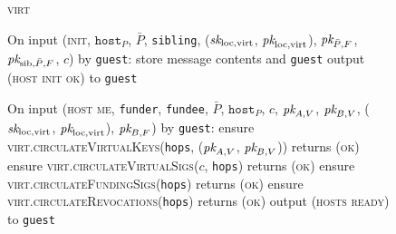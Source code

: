 \begin{figure}[H]
  \begin{processbox}{\textsc{virt}}
    \begin{algorithmic}[1]
      \State On input (\textsc{init}, $\texttt{host}_P$, $\bar{P}$,
      \texttt{sibling}, ($\textit{sk}_{\mathrm{loc}, \mathrm{virt}}$, $\textit{pk}_{\mathrm{loc},
      \mathrm{virt}}$), $\textit{pk}_{\bar{P}, F}$, $\textit{pk}_{\mathrm{sib}, \bar{P}, F}$, $c$)
      by \texttt{guest}:
      \Indent
        \State store message contents and \texttt{guest}
        \State output (\textsc{host init ok}) to \texttt{guest}
      \EndIndent
      \Statex

      \State On input (\textsc{host me}, \texttt{funder}, \texttt{fundee},
      $\bar{P}$, $\texttt{host}_P$, $c$, $\textit{pk}_{A, V}$, $\textit{pk}_{B, V}$,
      ($\textit{sk}_{\mathrm{loc}, \mathrm{virt}}$, $\textit{pk}_{\mathrm{loc}, \mathrm{virt}}$),
      $\textit{pk}_{B, F}$) by \texttt{guest}:
      \State {}
      \Indent
        \State ensure \textsc{virt.circulateVirtualKeys}(\texttt{hops}, ($\textit{pk}_{A,
        V}$, $\textit{pk}_{B, V}$)) returns (\textsc{ok})
        \State ensure \textsc{virt.circulateVirtualSigs}($c$, \texttt{hops})
        returns (\textsc{ok})
        \State ensure \textsc{virt.circulateFundingSigs}(\texttt{hops}) returns
        (\textsc{ok})
        \State ensure \textsc{virt.circulateRevocations}(\texttt{hops}) returns
        (\textsc{ok})
        \State output (\textsc{hosts ready}) to \texttt{guest}
      \EndIndent
      \Statex


\end{algorithmic}
\end{processbox}
\end{figure}
